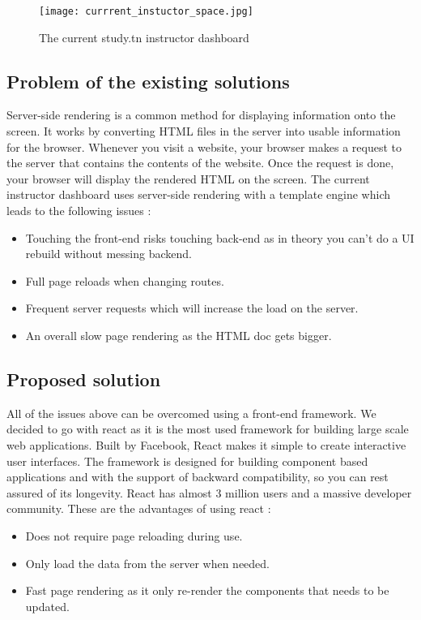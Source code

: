 \begin{figure}[!ht]
    \centering
    \texttt{[image: currrent\_instuctor\_space.jpg]}
    \caption{The current study.tn instructor dashboard}
    \label{fig:currrent_instuctor_space}
\end{figure}

\subsection{Problem of the existing solutions}
Server-side rendering is a common method for displaying information onto the screen. It works by converting HTML files in the server into usable information for the browser. Whenever you visit a website, your browser makes a request to the server that contains the contents of the website. Once the request is done, your browser will display the rendered HTML on the screen. The current instructor dashboard uses server-side rendering with a template engine which leads to the following issues : 
\begin{itemize}
  \item Touching the front-end risks touching back-end as in theory you can't do a UI rebuild without messing backend.
  \item Full page reloads when changing routes.
  \item Frequent server requests which will increase the load on the server.
  \item An overall slow page rendering as the HTML doc gets bigger.

\end{itemize}

\subsection{Proposed solution}
All of the issues above can be overcomed using a front-end framework. We decided to go with react as it is the most used framework for building large scale web applications. Built by Facebook, React makes it simple to create interactive user interfaces. The framework is designed for building component based applications and with the support of backward compatibility, so you can rest assured of its longevity. React has almost 3 million users and a massive developer community. These are the advantages of using react :


\begin{itemize}
  \item Does not require page reloading during use.
  \item Only load the data from the server when needed.
  \item Fast page rendering as it only re-render the components that needs to be updated.
\end{itemize}


